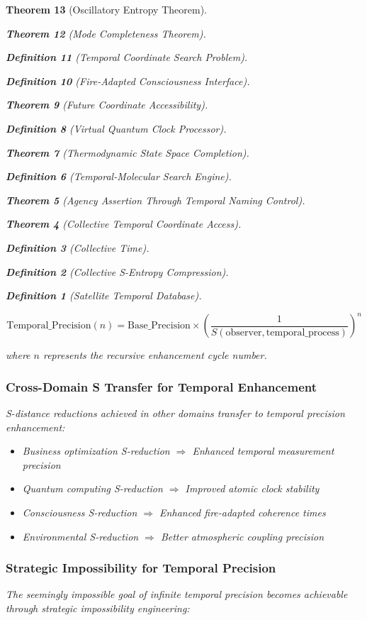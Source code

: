\documentclass[12pt,a4paper]{article}
\newtheorem{theorem}{Theorem}[section]
\newtheorem{definition}[theorem]{Definition}
\begin{document}
\begin{theorem}[Oscillatory Entropy Theorem]
\begin{theorem}[Mode Completeness Theorem]
\begin{enumerate}
\begin{definition}[Temporal Coordinate Search Problem]
\begin{algorithm}
\begin{definition}[Fire-Adapted Consciousness Interface]
\begin{theorem}[Future Coordinate Accessibility]
\begin{definition}[Virtual Quantum Clock Processor]
\begin{itemize}
\begin{itemize}
\begin{theorem}[Thermodynamic State Space Completion]
\begin{definition}[Temporal-Molecular Search Engine]
\begin{theorem}[Agency Assertion Through Temporal Naming Control]
\begin{remark}
\begin{theorem}[Collective Temporal Coordinate Access]
\begin{definition}[Collective Time]
\begin{definition}[Collective S-Entropy Compression]
\begin{definition}[Satellite Temporal Database]
\begin{algorithm}
\begin{table}[h]
{{\begin{equation}
\text{Temporal\_Precision}(n) = \text{Base\_Precision} \times \left(\frac{1}{S(\text{observer}, \text{temporal\_process})}\right)^n
\end{equation}

where $n$ represents the recursive enhancement cycle number.

\subsubsection{Cross-Domain S Transfer for Temporal Enhancement}

S-distance reductions achieved in other domains transfer to temporal precision enhancement:

\begin{itemize}
\item Business optimization S-reduction $\Rightarrow$ Enhanced temporal measurement precision
\item Quantum computing S-reduction $\Rightarrow$ Improved atomic clock stability
\item Consciousness S-reduction $\Rightarrow$ Enhanced fire-adapted coherence times
\item Environmental S-reduction $\Rightarrow$ Better atmospheric coupling precision
\end{itemize}

\subsubsection{Strategic Impossibility for Temporal Precision}

The seemingly impossible goal of infinite temporal precision becomes achievable through strategic impossibility engineering:

}}
\end{table}
\end{algorithm}
\end{definition}
\end{definition}
\end{definition}
\end{theorem}
\end{remark}
\end{theorem}
\end{definition}
\end{theorem}
\end{itemize}
\end{itemize}
\end{definition}
\end{theorem}
\end{definition}
\end{algorithm}
\end{definition}
\end{enumerate}
\end{theorem}
\end{theorem}
\end{document}
